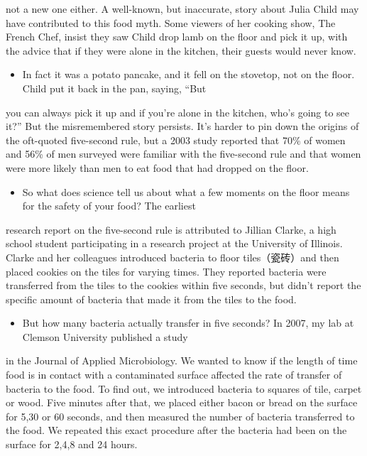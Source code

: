 \documentclass[UTF8,11pt]{ctexart}
\begin{document}
not a new one either. A well-known, but inaccurate, story about Julia Child may have contributed to this food myth. Some viewers of her cooking show, The French Chef, insist they saw Child drop lamb on the floor and pick it up, with the advice that if they were alone in the kitchen, their guests would never know.


\begin{itemize}[leftmargin=2em,itemsep=.2em,topsep=.4em]\item[E.] In fact it was a potato pancake, and it fell on the stovetop, not on the floor. Child put it back in the pan, saying, “But
\end{itemize}

you can always pick it up and if you’re alone in the kitchen, who’s going to see it?” But the misremembered story persists. It’s harder to pin down the origins of the oft-quoted five-second rule, but a 2003 study reported that 70\% of women and 56\% of men surveyed were familiar with the five-second rule and that women were more likely than men to eat food that had dropped on the floor.


\begin{itemize}[leftmargin=2em,itemsep=.2em,topsep=.4em]\item[F.] So what does science tell us about what a few moments on the floor means for the safety of your food? The earliest
\end{itemize}

research report on the five-second rule is attributed to Jillian Clarke, a high school student participating in a research project at the University of Illinois. Clarke and her colleagues introduced bacteria to floor tiles（瓷砖）and then placed cookies on the tiles for varying times. They reported bacteria were transferred from the tiles to the cookies within five seconds, but didn’t report the specific amount of bacteria that made it from the tiles to the food.


\begin{itemize}[leftmargin=2em,itemsep=.2em,topsep=.4em]\item[G.] But how many bacteria actually transfer in five seconds? In 2007, my lab at Clemson University published a study
\end{itemize}

in the Journal of Applied Microbiology. We wanted to know if the length of time food is in contact with a contaminated surface affected the rate of transfer of bacteria to the food. To find out, we introduced bacteria to squares of tile, carpet or wood. Five minutes after that, we placed either bacon or bread on the surface for 5,30 or 60 seconds, and then measured the number of bacteria transferred to the food. We repeated this exact procedure after the bacteria had been on the surface for 2,4,8 and 24 hours.
\end{document}
